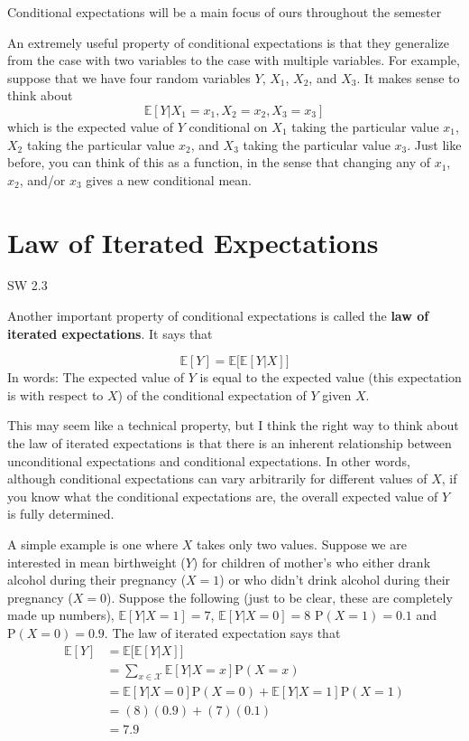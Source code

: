 \documentclass[
  letterpaper,
  DIV=11,
  numbers=noendperiod]{scrreprt}
\begin{document}
Conditional expectations will be a main focus of ours throughout the
semester

An extremely useful property of conditional expectations is that they
generalize from the case with two variables to the case with multiple
variables. For example, suppose that we have four random variables
\(Y\), \(X_1\), \(X_2\), and \(X_3\). It makes sense to think about \[
  \mathbb{E}[Y|X_1=x_1, X_2=x_2, X_3=x_3]
\] which is the expected value of \(Y\) conditional on \(X_1\) taking
the particular value \(x_1\), \(X_2\) taking the particular value
\(x_2\), and \(X_3\) taking the particular value \(x_3\). Just like
before, you can think of this as a function, in the sense that changing
any of \(x_1\), \(x_2\), and/or \(x_3\) gives a new conditional mean.

\section{Law of Iterated
Expectations}\label{law-of-iterated-expectations}

SW 2.3

Another important property of conditional expectations is called the
\textbf{law of iterated expectations}. It says that

\[
  \mathbb{E}[Y] = \mathbb{E}\big[ \mathbb{E}[Y|X] \big]
\] In words: The expected value of \(Y\) is equal to the expected value
(this expectation is with respect to \(X\)) of the conditional
expectation of \(Y\) given \(X\).

This may seem like a technical property, but I think the right way to
think about the law of iterated expectations is that there is an
inherent relationship between unconditional expectations and conditional
expectations. In other words, although conditional expectations can vary
arbitrarily for different values of \(X\), if you know what the
conditional expectations are, the overall expected value of \(Y\) is
fully determined.

A simple example is one where \(X\) takes only two values. Suppose we
are interested in mean birthweight (\(Y\)) for children of mother's who
either drank alcohol during their pregnancy (\(X=1\)) or who didn't
drink alcohol during their pregnancy (\(X=0\)). Suppose the following
(just to be clear, these are completely made up numbers),
\(\mathbb{E}[Y|X=1] = 7\), \(\mathbb{E}[Y|X=0]=8\)
\(\mathrm{P}(X=1) = 0.1\) and \(\mathrm{P}(X=0)=0.9\). The law of
iterated expectation says that \[
  \begin{aligned}
  \mathbb{E}[Y] &= \mathbb{E}\big[ \mathbb{E}[Y|X] \big] \\
  &= \sum_{x \in \mathcal{X}} \mathbb{E}[Y|X=x] \mathrm{P}(X=x) \\
  &= \mathbb{E}[Y|X=0]\mathrm{P}(X=0) + \mathbb{E}[Y|X=1]\mathrm{P}(X=1) \\
  &= (8)(0.9) + (7)(0.1) \\
  &= 7.9
  \end{aligned}
\]
\end{document}
